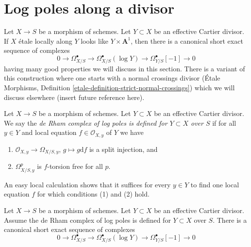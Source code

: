 \section{Log poles along a divisor}
\label{section-divisor}

\noindent
Let $X \to S$ be a morphism of schemes. Let $Y \subset X$ be an
effective Cartier divisor. If $X$ \'etale locally along $Y$ looks
like $Y \times \mathbf{A}^1$, then there is a canonical short exact sequence
of complexes
$$
0 \to \Omega^\bullet_{X/S} \to
\Omega^\bullet_{X/S}(\log Y) \to
\Omega^\bullet_{Y/S}[-1] \to 0
$$
having many good properties we will discuss in this section. There is a
variant of this construction where one starts with a normal crossings
divisor
(\'Etale Morphisms, Definition \ref{etale-definition-strict-normal-crossings})
which we will discuss elsewhere (insert future reference here).

\begin{definition}
\label{definition-local-product}
Let $X \to S$ be a morphism of schemes. Let $Y \subset X$ be an
effective Cartier divisor. We say the
{\it de Rham complex of log poles is defined for $Y \subset X$ over $S$}
if for all $y \in Y$ and local equation $f \in \mathcal{O}_{X, y}$
of $Y$ we have
\begin{enumerate}
\item $\mathcal{O}_{X, y} \to \Omega_{X/S, y}$, $g \mapsto g \text{d}f$
is a split injection, and
\item $\Omega^p_{X/S, y}$ is $f$-torsion free for all $p$.
\end{enumerate}
\end{definition}

\noindent
An easy local calculation shows that it suffices for every $y \in Y$
to find one local equation $f$ for which conditions (1) and (2) hold.

\begin{lemma}
\label{lemma-log-complex}
Let $X \to S$ be a morphism of schemes. Let $Y \subset X$ be an
effective Cartier divisor.
Assume the de Rham complex of log poles is defined for $Y \subset X$ over $S$.
There is a canonical short exact sequence
of complexes
$$
0 \to \Omega^\bullet_{X/S} \to
\Omega^\bullet_{X/S}(\log Y) \to
\Omega^\bullet_{Y/S}[-1] \to 0
$$
\end{lemma}


